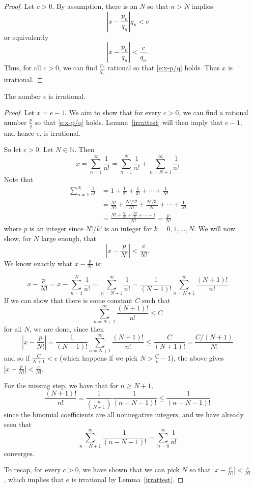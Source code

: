 \documentclass[11pt,dvipsnames]{book}
\numberwithin{figure}{section} %
\numberwithin{table}{section} %
\begin{document}
\begin{proof}
Let $c>0$. By assumption,
there is an $N$ so that $n> N$ implies
\[
\left|x-\frac{p_{n}}{q_{n}}\right|q_n<c \]
or equivalently
\[\left|x-\frac{p_{n}}{q_{n}}\right| < \frac{c}{q_n}.
\]
Thus, for all $c>0$, we can find $\frac{p_n}{q_n}$ rational so that \eqref{e:x-p/q} holds. Thus $x$ is irrational.
\end{proof}

\begin{theorem}
The number $e$ is irrational.
\end{theorem}

\begin{proof}
Let $x = e-1$. We aim to show that for every $c>0$, we can find a rational number $\frac{p}{q}$ so that \eqref{e:x-p/q} holds. Lemma~\ref{irrattest} will then imply that $e-1$, and hence $e$, is irrational.

So let $c>0$. Let $N\in\mathbb{N}$. Then
\[
x=\sum_{n=1}^{\infty} \frac{1}{n!}
=\sum_{n=1}^{N}\frac{1}{n!} + \sum_{n=N+1}^{\infty}\frac{1}{n!}
\]
Note that
\begin{align*}
\sum_{n=1}^{N}\frac{1}{n!}
& =1+\frac{1}{2!}+\frac{1}{3!}+\cdots + \frac{1}{N!}\\
& = \frac{N!}{N!}+\frac{N!/2!}{N!}+\frac{N!/3!}{N!}+\cdots + \frac{1}{N!}\\
& = \frac{N!+\frac{N!}{2!}+\frac{N!}{3!}+\cdots + 1}{N!} = \frac{p}{N!}
\end{align*}
where $p$ is an integer since $N!/k!$ is an integer for $k=0,1,...,N$. We will now show, for $N$ large enough, that
\[
\left| x-\frac{p}{N!}\right|<\frac{c}{N!}.\]
We know exactly what $x-\frac{p}{N!}$ is:

\[
x-\frac{p}{N!}
=x-\sum_{n=1}^{N}\frac{1}{n!}
=\sum_{n=N+1}^{\infty}\frac{1}{n!}
=\frac{1}{(N+1)!}\sum_{n=N+1}^{\infty}\frac{(N+1)!}{n!}
\]
If we can show that there is some constant $C$ such that \[\sum_{n=N+1}^{\infty}\frac{(N+1)!}{n!} \leq C\]
for all $N$, we are done, since then
\[
\left|x-\frac{p}{N!}\right|
=\frac{1}{(N+1)!}\sum_{n=N+1}^{\infty}\frac{(N+1)!}{n!}
\leq \frac{C}{(N+1)!}=\frac{C/(N+1)}{N!}
\]
and so if $\frac{C}{N+1}<c$ (which happens if we pick $N>\frac{C}{c}-1$), the above gives $\left|x-\frac{p}{N!}\right|<\frac{c}{N!}$.

\medskip
For the missing step, we have that for $n \geq N+1$,
\[ \frac{(N+1)!}{n!} =
\frac{1}{{n\choose N+1}}
\frac{1}{(n-N-1)!}
\leq \frac{1}{(n-N-1)!}
\]
since the binomial coefficients are all nonnegative integers, and we have already seen that
\[ \sum_{n = N+1}^\infty \frac{1}{(n-N-1)!} = \sum_{n=0}^\infty\frac{1}{n!}\]
converges.

To recap, for every $c>0$, we have shown that we can pick $N$ so that $\left|x-\frac{p}{N!}\right|<\frac{c}{N!}$, which implies that $e$ is irrational by Lemma~\ref{irrattest}.
\end{proof}
\end{document}
